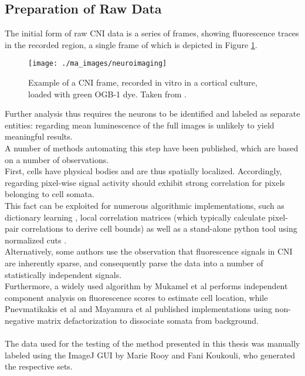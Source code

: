 \documentclass[titlepage]{article}
\begin{document}
\subsection{Preparation of Raw Data}\label{annotation}
The initial form of raw CNI data is a series of frames, showing fluorescence traces in the recorded region, a single frame of which is depicted in Figure \ref{fig:neuroimaging}.\\
\begin{figure}[h]
\centering
\texttt{[image: ./ma\_images/neuroimaging]}
\caption{Example of a CNI frame, recorded in vitro in a cortical culture, loaded with green OGB-1 dye. Taken from \cite{noauthor_meaney_nodate}.}
\label{fig:neuroimaging}
\end{figure}
Further analysis thus requires the neurons to be identified and labeled as separate entities: regarding mean luminescence of the full images is unlikely to yield meaningful results.\\
A number of methods automating this step have been published, which are based on a number of observations.\\
First, cells have physical bodies and are thus spatially localized. Accordingly, regarding pixel-wise signal activity should exhibit strong correlation for pixels belonging to cell somata. \\
This fact can be exploited for numerous algorithmic implementations, such as dictionary learning \cite{pachitariu_extracting_2013}, local correlation matrices (which typically calculate pixel-pair correlations to derive cell bounds) \cite{smith_parallel_2010} as well as a stand-alone python tool using normalized cuts \cite{kaifosh_sima:_2014}.\\
Alternatively, some authors use the observation that fluorescence signals in CNI are inherently sparse, and consequently parse the data into a number of statistically independent signals.\\
Furthermore, a widely used algorithm by Mukamel et al \cite{mukamel_automated_2009} performs independent component analysis on fluorescence scores to estimate cell location, while Pnevmatikakis et al\cite{pnevmatikakis_simultaneous_2016} and Mayamura et al\cite{maruyama_detecting_2014} published implementations using non-negative matrix defactorization to dissociate somata from background.\\\\
The data used for the testing of the method presented in this thesis was manually labeled using the ImageJ GUI \cite{noauthor_imagej_nodate} by Marie Rooy and Fani Koukouli, who generated the respective sets.\\
\end{document}
